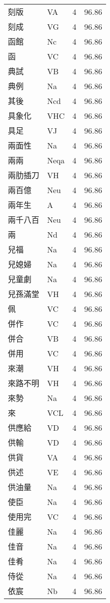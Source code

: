 \documentclass[twocolumn]{book}
\begin{document}
\begin{supertabular}{llrr}
刻版 & VA & 4 &  96.86\\
刻成 & VG & 4 &  96.86\\
函館 & Nc & 4 &  96.86\\
函 & VC & 4 &  96.86\\
典試 & VB & 4 &  96.86\\
典例 & Na & 4 &  96.86\\
其後 & Ncd & 4 &  96.86\\
具象化 & VHC & 4 &  96.86\\
具足 & VJ & 4 &  96.86\\
兩面性 & Na & 4 &  96.86\\
兩兩 & Neqa & 4 &  96.86\\
兩肋插刀 & VH & 4 &  96.86\\
兩百億 & Neu & 4 &  96.86\\
兩年生 & A & 4 &  96.86\\
兩千八百 & Neu & 4 &  96.86\\
兩 & Nd & 4 &  96.86\\
兒福 & Na & 4 &  96.86\\
兒媳婦 & Na & 4 &  96.86\\
兒童劇 & Na & 4 &  96.86\\
兒孫滿堂 & VH & 4 &  96.86\\
佩 & VC & 4 &  96.86\\
併作 & VC & 4 &  96.86\\
併合 & VB & 4 &  96.86\\
併用 & VC & 4 &  96.86\\
來潮 & VH & 4 &  96.86\\
來路不明 & VH & 4 &  96.86\\
來勢 & Na & 4 &  96.86\\
來 & VCL & 4 &  96.86\\
供應給 & VD & 4 &  96.86\\
供輸 & VD & 4 &  96.86\\
供貨 & VA & 4 &  96.86\\
供述 & VE & 4 &  96.86\\
供油量 & Na & 4 &  96.86\\
使臣 & Na & 4 &  96.86\\
使用完 & VC & 4 &  96.86\\
佳麗 & Na & 4 &  96.86\\
佳音 & Na & 4 &  96.86\\
佳肴 & Na & 4 &  96.86\\
侍從 & Na & 4 &  96.86\\
依宸 & Nb & 4 &  96.86\\

\end{supertabular}
\end{document}
